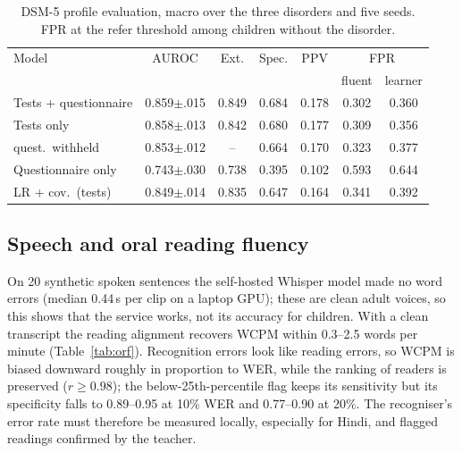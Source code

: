 \documentclass[conference]{IEEEtran}
\newcommand{\pmsd}[2]{#1{\scriptsize$\pm$#2}}
\begin{document}
\begin{table}[!t]
\centering
\caption{DSM-5 profile evaluation, macro over the three disorders and five seeds. FPR at the refer threshold among children without the disorder.}
\label{tab:dsm5}
\footnotesize
\setlength{\tabcolsep}{2.5pt}
\begin{tabular}{@{}lcccccc@{}}
\toprule
Model & AUROC & Ext. & Spec. & PPV & \multicolumn{2}{c}{FPR} \\
 & & & & & fluent & learner \\
\midrule
Tests + questionnaire & \pmsd{0.859}{.015} & 0.849 & 0.684 & 0.178 & 0.302 & 0.360 \\
Tests only & \pmsd{0.858}{.013} & 0.842 & 0.680 & 0.177 & 0.309 & 0.356 \\
\quad quest.\ withheld & \pmsd{0.853}{.012} & -- & 0.664 & 0.170 & 0.323 & 0.377 \\
Questionnaire only & \pmsd{0.743}{.030} & 0.738 & 0.395 & 0.102 & 0.593 & 0.644 \\
LR + cov.\ (tests) & \pmsd{0.849}{.014} & 0.835 & 0.647 & 0.164 & 0.341 & 0.392 \\
\bottomrule
\end{tabular}
\end{table}

\subsection{Speech and oral reading fluency}
On 20 synthetic spoken sentences the self-hosted Whisper model made no word errors (median 0.44\,s per clip on a laptop GPU); these are clean adult voices, so this shows that the service works, not its accuracy for children. With a clean transcript the reading alignment recovers WCPM within 0.3--2.5 words per minute (Table~\ref{tab:orf}). Recognition errors look like reading errors, so WCPM is biased downward roughly in proportion to WER, while the ranking of readers is preserved ($r\geq0.98$); the below-25th-percentile flag keeps its sensitivity but its specificity falls to 0.89--0.95 at 10\% WER and 0.77--0.90 at 20\%. The recogniser's error rate must therefore be measured locally, especially for Hindi, and flagged readings confirmed by the teacher.
\end{document}
